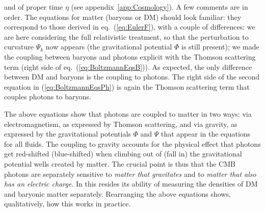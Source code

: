 and of proper time $\eta$ (see appendix~\ref{app:Cosmology}).  
A few comments are in order. The equations for matter (baryons or DM) should look familiar: they correspond to those derived in eq.~(\ref{eq:EulerF}), with a couple of differences: we are here considering the full relativistic treatment, 
so that the perturbation to curvature $\Psi_k$ now appears (the gravitational potential $\Phi$ is still present); 
we made the coupling between baryons and photons explicit with the Thomson scattering term (right side of eq.~(\ref{eq:BoltzmannEqsB})). As expected, the only difference between DM and baryons is the coupling to photons. 
The right side of the second equation in (\ref{eq:BoltzmannEqsPh}) is again the Thomson scattering term that couples photons to baryons. 

\medskip

The above equations show that photons are coupled to matter in two ways: via electromagnetism, as expressed by Thomson scattering, and via gravity, as expressed by the gravitational potentials $\Phi$ and $\Psi$ that appear in the equations for all fluids. 
The coupling to gravity accounts for the physical effect that photons get red-shifted (blue-shifted) when climbing out of (fall in) the gravitational potential wells created by matter. 
The crucial point is thus that the CMB photons are separately sensitive to {\em matter that gravitates} and to {\em matter that also has an electric charge}. 
In this resides its ability of measuring the densities of DM and baryonic matter separately. 
Rearranging the above equations shows, qualitatively, how this works in practice.

\medskip

